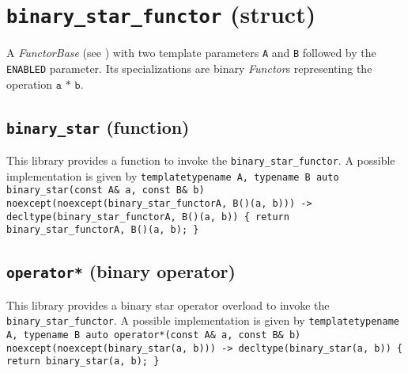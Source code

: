 \section{\texttt{binary\_star\_functor} (struct)}
A \textit{FunctorBase} (see \cite{functors}) with two template parameters \texttt{A} and \texttt{B} followed by the \texttt{ENABLED} parameter.
Its specializations are binary \textit{Functor}s representing the operation $\texttt{a * b}$.

\subsection{\texttt{binary\_star} (function)}
This library provides a function to invoke the \texttt{binary\_star\_functor}.
A possible implementation is given by\newline
\texttt{template\textlangle typename A, typename B\textrangle\newline
auto\newline
binary\_star(const A\& a, const B\& b)\newline
noexcept(noexcept(binary\_star\_functor\textlangle A, B\textrangle()(a, b)))\newline
-> decltype(binary\_star\_functor\textlangle A, B\textrangle()(a, b))\newline
\{ return binary\_star\_functor\textlangle A, B\textrangle()(a, b); \}}

\subsection{\texttt{operator*} (binary operator)}
This library provides a binary star operator overload to invoke the \texttt{binary\_star\_functor}.
A possible implementation is given by\newline
\texttt{template\textlangle typename A, typename B\textrangle\newline
auto\newline
operator*(const A\& a, const B\& b)\newline
noexcept(noexcept(binary\_star(a, b)))\newline
-> decltype(binary\_star(a, b))\newline
\{ return binary\_star(a, b); \}}